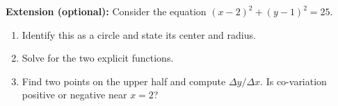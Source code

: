 \documentclass[10pt]{article}
\begin{document}
\vspace{0.08in}

\begin{extensionbox}
\textbf{Extension (optional):} Consider the equation $(x-2)^2 + (y-1)^2 = 25$.
\begin{enumerate}[leftmargin=1.5em, itemsep=4pt]
    \item Identify this as a circle and state its center and radius.
    \item Solve for the two explicit functions.
    \item Find two points on the upper half and compute $\Delta y/\Delta x$. Is co-variation
          positive or negative near $x = 2$?
\end{enumerate}
\end{extensionbox}
\end{document}
